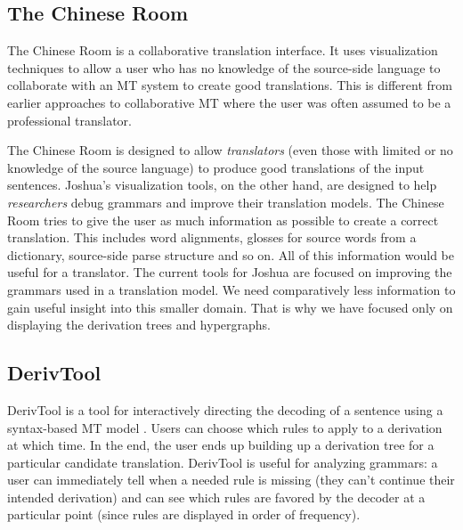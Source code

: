\documentclass[logo]{pbml}
\begin{document}
\subsection{The Chinese Room}

The Chinese Room \cite{albrecht-hwa-marai:2009:EACL} is a collaborative translation interface. It uses visualization
techniques to allow a user who has no knowledge of the source-side language to
collaborate with an MT system to create good translations. This is different
from earlier approaches to collaborative MT where the user was often assumed to
 be a professional translator. 

The Chinese
Room is designed to allow {\em translators} (even those with limited or no
knowledge of the source language) to produce good translations of the input
sentences. Joshua's visualization tools, on the other hand, are designed to
help {\em researchers} debug grammars and improve their translation models.
The Chinese Room tries to give the user as much information as possible to
create a correct translation. This includes word alignments, glosses for
source words from a dictionary, source-side parse structure and so on. All
of this information would be useful for a translator.
The current tools for Joshua are focused on improving
the grammars used in a translation model. We need comparatively less 
information to gain useful insight into this smaller domain. That is why we
have focused only on displaying the derivation trees and hypergraphs.

\subsection{DerivTool}

DerivTool is a tool for interactively directing the decoding of a sentence
using a syntax-based MT model \cite{deneefe-knight-chan:2005:PosterDemo}. Users can choose which
rules to apply to a derivation at which time. In the end, the user ends up
building up a derivation tree for a particular candidate translation. DerivTool
is useful for analyzing grammars: a user can immediately tell when a needed
rule is missing (they can't continue their intended derivation) and can see
which rules are favored by the decoder at a particular point (since rules are
displayed in order of frequency).
\end{document}
